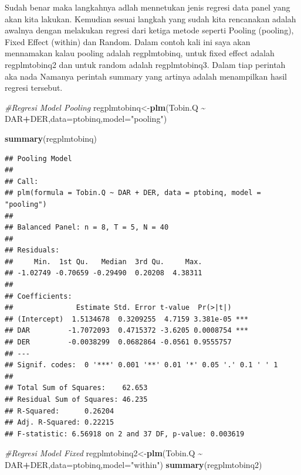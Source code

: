 \documentclass[
]{book}
\newenvironment{Shaded}{\begin{snugshade}}{\end{snugshade}}
\newcommand{\AttributeTok}[1]{\textcolor[rgb]{0.13,0.29,0.53}{#1}}
\newcommand{\CommentTok}[1]{\textcolor[rgb]{0.56,0.35,0.01}{\textit{#1}}}
\newcommand{\FunctionTok}[1]{\textcolor[rgb]{0.13,0.29,0.53}{\textbf{#1}}}
\newcommand{\NormalTok}[1]{#1}
\newcommand{\OtherTok}[1]{\textcolor[rgb]{0.56,0.35,0.01}{#1}}
\newcommand{\SpecialCharTok}[1]{\textcolor[rgb]{0.81,0.36,0.00}{\textbf{#1}}}
\newcommand{\StringTok}[1]{\textcolor[rgb]{0.31,0.60,0.02}{#1}}
\theoremstyle{definition}
\theoremstyle{definition}
\theoremstyle{definition}
\theoremstyle{definition}
\theoremstyle{remark}
\begin{document}
Sudah benar maka langkahnya adlah mennetukan jenis regresi data panel yang akan kita lakukan. Kemudian sesuai langkah yang sudah kita rencanakan adalah awalnya dengan melakukan regresi dari ketiga metode seperti Pooling (pooling), Fixed Effect (within) dan Random. Dalam contoh kali ini saya akan mennamakan kalau pooling adalah regplmtobinq, untuk fixed effect adalah regplmtobinq2 dan untuk random adalah regplmtobinq3. Dalam tiap perintah aka nada Namanya perintah summary yang artinya adalah menampilkan hasil regresi tersebut.

\begin{Shaded}
\begin{Highlighting}[]
\CommentTok{\#Regresi Model Pooling }
\NormalTok{regplmtobinq}\OtherTok{\textless{}{-}}\FunctionTok{plm}\NormalTok{(Tobin.Q }\SpecialCharTok{\textasciitilde{}}\NormalTok{ DAR}\SpecialCharTok{+}\NormalTok{DER,}\AttributeTok{data=}\NormalTok{ptobinq,}\AttributeTok{model=}\StringTok{"pooling"}\NormalTok{)}

\FunctionTok{summary}\NormalTok{(regplmtobinq)}
\end{Highlighting}
\end{Shaded}

\begin{verbatim}
## Pooling Model
## 
## Call:
## plm(formula = Tobin.Q ~ DAR + DER, data = ptobinq, model = "pooling")
## 
## Balanced Panel: n = 8, T = 5, N = 40
## 
## Residuals:
##     Min.  1st Qu.   Median  3rd Qu.     Max. 
## -1.02749 -0.70659 -0.29490  0.20208  4.38311 
## 
## Coefficients:
##               Estimate Std. Error t-value  Pr(>|t|)    
## (Intercept)  1.5134678  0.3209255  4.7159 3.381e-05 ***
## DAR         -1.7072093  0.4715372 -3.6205 0.0008754 ***
## DER         -0.0038299  0.0682864 -0.0561 0.9555757    
## ---
## Signif. codes:  0 '***' 0.001 '**' 0.01 '*' 0.05 '.' 0.1 ' ' 1
## 
## Total Sum of Squares:    62.653
## Residual Sum of Squares: 46.235
## R-Squared:      0.26204
## Adj. R-Squared: 0.22215
## F-statistic: 6.56918 on 2 and 37 DF, p-value: 0.003619
\end{verbatim}

\begin{Shaded}
\begin{Highlighting}[]
\CommentTok{\#Regresi Model Fixed }
\NormalTok{regplmtobinq2}\OtherTok{\textless{}{-}}\FunctionTok{plm}\NormalTok{(Tobin.Q }\SpecialCharTok{\textasciitilde{}}\NormalTok{ DAR}\SpecialCharTok{+}\NormalTok{DER,}\AttributeTok{data=}\NormalTok{ptobinq,}\AttributeTok{model=}\StringTok{"within"}\NormalTok{)}
\FunctionTok{summary}\NormalTok{(regplmtobinq2)}
\end{Highlighting}
\end{Shaded}
\end{document}
